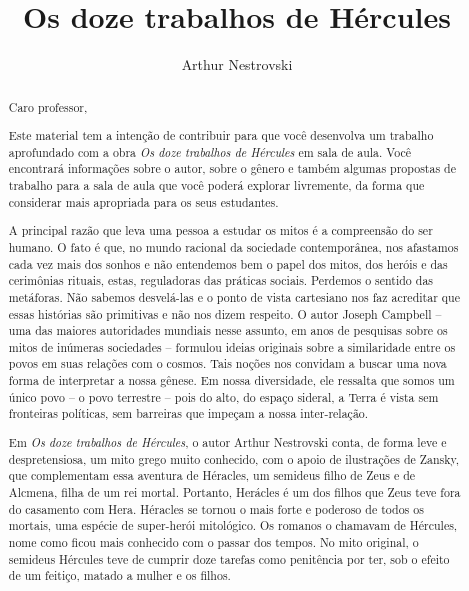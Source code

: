 \documentclass[11pt]{extarticle}
\newcommand{\AutorLivro}{Arthur Nestrovski}
\newcommand{\TituloLivro}{Os doze trabalhos de Hércules}
\newcommand{\colaborador}{Gabriela Karam}
\begin{document}
\title{\TituloLivro}
\author{\AutorLivro}
\def\authornotes{\colaborador}

\date{}
\maketitle


\tableofcontents


\begin{abstract}

Caro professor,

Este material tem a intenção de contribuir para que você desenvolva um trabalho aprofundado com a obra \textit{Os doze trabalhos de Hércules} em sala de aula. Você encontrará informações sobre o autor, sobre o gênero e também algumas propostas de trabalho para a sala de aula que você poderá explorar livremente, da forma que considerar mais apropriada para os seus estudantes. 

A principal razão que leva uma pessoa a estudar os mitos é a compreensão do ser humano. O fato é que, no mundo racional da sociedade contemporânea, nos afastamos cada vez mais dos sonhos e não entendemos bem o papel dos mitos, dos heróis e das cerimônias rituais, estas, reguladoras das práticas sociais. Perdemos o sentido das metáforas. Não sabemos desvelá-las e o ponto de vista cartesiano nos faz acreditar que essas histórias são primitivas e não nos dizem respeito. O autor Joseph Campbell -- uma das maiores autoridades mundiais nesse assunto, em anos de pesquisas sobre os mitos de inúmeras sociedades -- formulou ideias originais sobre a similaridade entre os povos em suas relações com o cosmos. Tais noções nos convidam a buscar uma nova forma de interpretar a nossa gênese. Em nossa diversidade, ele ressalta que somos um único povo – o povo terrestre – pois do alto, do espaço sideral, a Terra é vista sem fronteiras políticas, sem barreiras que impeçam a nossa inter-relação. 

Em \textit{Os doze trabalhos de Hércules}, o autor Arthur Nestrovski conta, de forma leve e despretensiosa, um mito grego muito conhecido, com o apoio de ilustrações de Zansky, que complementam essa aventura de Héracles, um semideus filho de Zeus e de Alcmena, filha de um rei mortal. Portanto, Herácles é um dos filhos que Zeus teve fora do casamento com Hera. Héracles se tornou o mais forte e poderoso de todos os mortais, uma espécie de super-herói mitológico. Os romanos o chamavam de Hércules, nome como ficou mais conhecido com o passar dos tempos. No mito original, o semideus Hércules teve de cumprir doze tarefas como penitência por ter, sob o efeito de um feitiço, matado a mulher e os filhos. 


\end{abstract}
\end{document}
